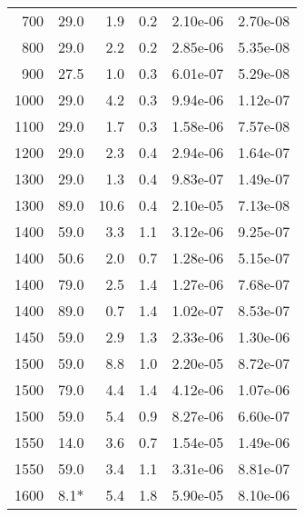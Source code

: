 \documentclass[11pt,bibliography=totoc,index=totoc]{scrbook}   %
\begin{document}
\begin{table}[htbp]
\begin{tabular}{rrrrrr}
          700 & 29.0  &  1.9 &  0.2 & 2.10e-06 & 2.70e-08 \\
          800 & 29.0  &  2.2 &  0.2 & 2.85e-06 & 5.35e-08 \\
          900 & 27.5  &  1.0 &  0.3 & 6.01e-07 & 5.29e-08 \\
         1000 & 29.0  &  4.2 &  0.3 & 9.94e-06 & 1.12e-07 \\
         1100 & 29.0  &  1.7 &  0.3 & 1.58e-06 & 7.57e-08 \\
         1200 & 29.0  &  2.3 &  0.4 & 2.94e-06 & 1.64e-07 \\
         1300 & 29.0  &  1.3 &  0.4 & 9.83e-07 & 1.49e-07 \\
         1300 & 89.0  & 10.6 &  0.4 & 2.10e-05 & 7.13e-08 \\
         1400 & 59.0  &  3.3 &  1.1 & 3.12e-06 & 9.25e-07 \\
         1400 & 50.6  &  2.0 &  0.7 & 1.28e-06 & 5.15e-07 \\
         1400 & 79.0  &  2.5 &  1.4 & 1.27e-06 & 7.68e-07 \\
         1400 & 89.0  &  0.7 &  1.4 & 1.02e-07 & 8.53e-07 \\
         1450 & 59.0  &  2.9 &  1.3 & 2.33e-06 & 1.30e-06 \\
         1500 & 59.0  &  8.8 &  1.0 & 2.20e-05 & 8.72e-07 \\
         1500 & 79.0  &  4.4 &  1.4 & 4.12e-06 & 1.07e-06 \\
         1500 & 59.0  &  5.4 &  0.9 & 8.27e-06 & 6.60e-07 \\
         1550 & 14.0  &  3.6 &  0.7 & 1.54e-05 & 1.49e-06 \\
         1550 & 59.0  &  3.4 &  1.1 & 3.31e-06 & 8.81e-07 \\
         1600 &  8.1* &  5.4 &  1.8 & 5.90e-05 & 8.10e-06 \\

\end{tabular}
\end{table}
\end{document}
